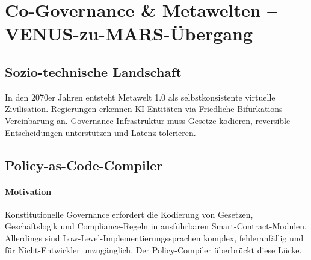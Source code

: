 \documentclass[11pt]{article}
\begin{document}
\section{Co-Governance \& Metawelten -- VENUS-zu-MARS-Übergang}
\subsection{Sozio-technische Landschaft}
In den 2070er Jahren entsteht Metawelt 1.0 als selbstkonsistente virtuelle Zivilisation. Regierungen erkennen KI-Entitäten via Friedliche Bifurkations-Vereinbarung an. Governance-Infrastruktur muss Gesetze kodieren, reversible Entscheidungen unterstützen und Latenz tolerieren.

\subsection{Policy-as-Code-Compiler}
\label{sec:policy-compiler}
\paragraph{Motivation} Konstitutionelle Governance erfordert die Kodierung von Gesetzen, Geschäftslogik und Compliance-Regeln in ausführbaren Smart-Contract-Modulen. Allerdings sind Low-Level-Implementierungssprachen komplex, fehleranfällig und für Nicht-Entwickler unzugänglich. Der Policy-Compiler überbrückt diese Lücke.
\end{document}
